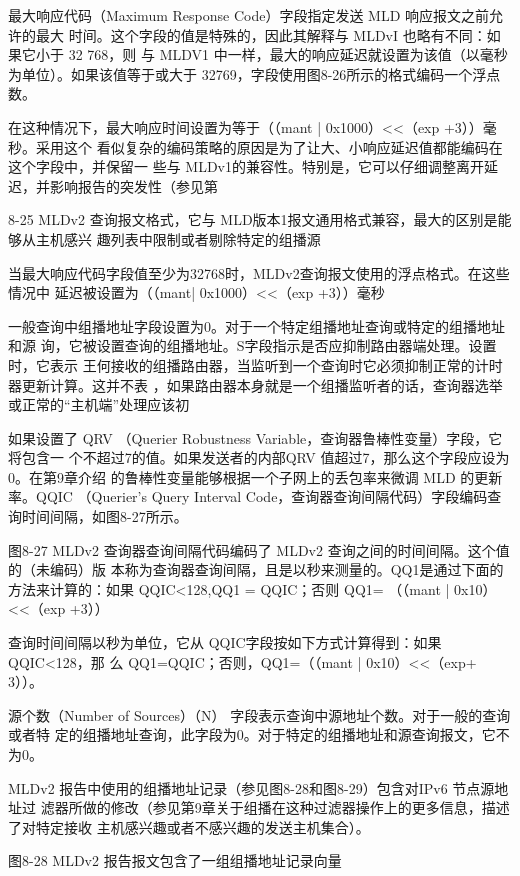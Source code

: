 最大响应代码（Maximum Response Code）字段指定发送 MLD 响应报文之前允许的最大
时间。这个字段的值是特殊的，因此其解释与 MLDvI 也略有不同：如果它小于 32 768，则
与 MLDV1 中一样，最大的响应延迟就设置为该值（以毫秒为单位）。如果该值等于或大于
32769，字段使用图8-26所示的格式编码一个浮点数。

在这种情况下，最大响应时间设置为等于（（mant | 0x1000）<<（exp +3））毫秒。采用这个
看似复杂的编码策略的原因是为了让大、小响应延迟值都能编码在这个字段中，并保留一
些与 MLDv1的兼容性。特别是，它可以仔细调整离开延迟，并影响报告的突发性（参见第

8-25 MLDv2 查询报文格式，它与 MLD版本1报文通用格式兼容，最大的区别是能够从主机感兴
趣列表中限制或者剔除特定的组播源

当最大响应代码字段值至少为32768时，MLDv2查询报文使用的浮点格式。在这些情况中
延迟被设置为（（mant| 0x1000）<<（exp +3））毫秒

一般查询中组播地址字段设置为0。对于一个特定组播地址查询或特定的组播地址和源
询，它被设置查询的组播地址。S字段指示是否应抑制路由器端处理。设置时，它表示
王何接收的组播路由器，当监听到一个查询时它必须抑制正常的计时器更新计算。这并不表
，如果路由器本身就是一个组播监听者的话，查询器选举或正常的“主机端”处理应该初

如果设置了 QRV （Querier Robustness Variable，查询器鲁棒性变量）字段，它将包含一
个不超过7的值。如果发送者的内部QRV 值超过7，那么这个字段应设为0。在第9章介绍
的鲁棒性变量能够根据一个子网上的丢包率来微调 MLD 的更新率。QQIC （Querier’s Query
Interval Code，查询器查询间隔代码）字段编码查询时间间隔，如图8-27所示。

图8-27 MLDv2 查询器查询间隔代码编码了 MLDv2 查询之间的时间间隔。这个值的（未编码）版
本称为查询器查询间隔，且是以秒来测量的。QQ1是通过下面的方法来计算的：如果
QQIC<128,QQ1 = QQIC；否则 QQ1= （（mant | 0x10）<<（exp +3））

查询时间间隔以秒为单位，它从 QQIC字段按如下方式计算得到：如果QQIC<128，那
么 QQ1=QQIC；否则，QQ1=（（mant | 0x10）<<（exp+ 3））。

源个数（Number of Sources）（N） 字段表示查询中源地址个数。对于一般的查询或者特
定的组播地址查询，此字段为0。对于特定的组播地址和源查询报文，它不为0。

MLDv2 报告中使用的组播地址记录（参见图8-28和图8-29）包含对IPv6 节点源地址过
滤器所做的修改（参见第9章关于组播在这种过滤器操作上的更多信息，描述了对特定接收
主机感兴趣或者不感兴趣的发送主机集合）。

图8-28 MLDv2 报告报文包含了一组组播地址记录向量

